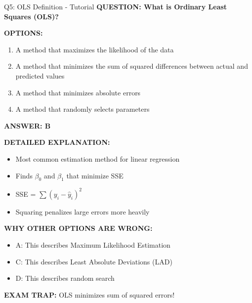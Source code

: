 \documentclass[8pt]{beamer}
\begin{document}
	\begin{frame}{Q5: OLS Definition - Tutorial}
		\fontsize{6.5}{7.5}\selectfont
		\textbf{QUESTION: What is Ordinary Least Squares (OLS)?}
		
		\vspace{0.1cm}
		\textbf{OPTIONS:}
		\begin{enumerate}
			\item A method that maximizes the likelihood of the data
			\item A method that minimizes the sum of squared differences between actual and predicted values
			\item A method that minimizes absolute errors
			\item A method that randomly selects parameters
		\end{enumerate}
		
		\vspace{0.1cm}
		\textcolor{myblue}{\textbf{ANSWER: B}}
		
		\vspace{0.1cm}
		\textbf{DETAILED EXPLANATION:}
		\begin{itemize}
			\item Most common estimation method for linear regression
			\item Finds $\beta_0$ and $\beta_1$ that minimize SSE
			\item SSE = $\sum (y_i - \hat{y}_i)^2$
			\item Squaring penalizes large errors more heavily
		\end{itemize}
		
		\vspace{0.1cm}
		\textcolor{myred}{\textbf{WHY OTHER OPTIONS ARE WRONG:}}
		\begin{itemize}
			\item \textcolor{myred}{A:} This describes Maximum Likelihood Estimation
			\item \textcolor{myred}{C:} This describes Least Absolute Deviations (LAD)
			\item \textcolor{myred}{D:} This describes random search
		\end{itemize}
		
		\textcolor{myred}{\textbf{EXAM TRAP:}} OLS minimizes \textcolor{myblue}{sum of squared errors}!
	\end{frame}
	
\end{document}
